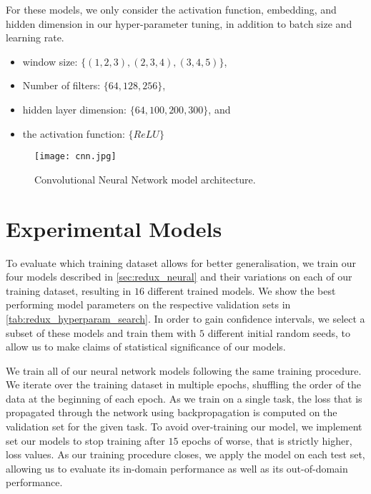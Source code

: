 For these models, we only consider the activation function, embedding, and hidden dimension in our hyper-parameter tuning, in addition to batch size and learning rate.

\begin{itemize}
  \item window size: $\{(1, 2, 3), (2, 3, 4), (3, 4, 5)\}$,
  \item Number of filters: $\{64, 128, 256\}$,
  \item hidden layer dimension: $\{64, 100, 200, 300\}$, and
  \item the activation function: $\{ReLU\}$
\end{itemize}

\begin{figure}
  \centering
  \texttt{[image: cnn.jpg]}
  \caption{Convolutional Neural Network model architecture.}
  \label{fig:liwc_cnn}
\end{figure}


\section{Experimental Models}

To evaluate which training dataset allows for better generalisation, we train our four models described in \cref{sec:redux_neural} and their variations on each of our training dataset, resulting in $16$ different trained models. We show the best performing model parameters on the respective validation sets in \cref{tab:redux_hyperparam_search}. In order to gain confidence intervals, we select a subset of these models and train them with $5$ different initial random seeds, to allow us to make claims of statistical significance of our models.

We train all of our neural network models following the same training procedure. We iterate over the training dataset in multiple epochs, shuffling the order of the data at the beginning of each epoch. As we train on a single task, the loss that is propagated through the network using backpropagation is computed on the validation set for the given task. To avoid over-training our model, we implement set our models to stop training after $15$ epochs of worse, that is strictly higher, loss values. As our training procedure closes, we apply the model on each test set, allowing us to evaluate its in-domain performance as well as its out-of-domain performance.

